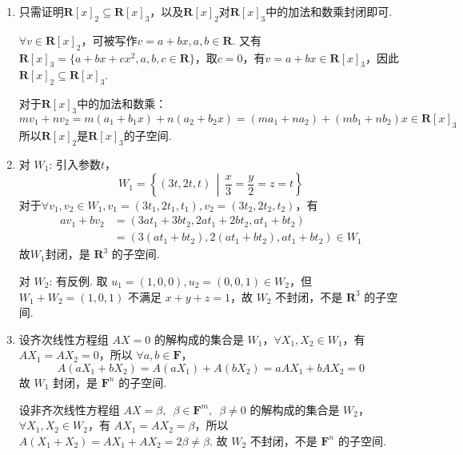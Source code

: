 \begin{solution}
    \begin{enumerate}
        \item 只需证明$\mathbf{R}[x]_2 \subseteq \mathbf{R}[x]_3$，以及$\mathbf{R}[x]_2$对$\mathbf{R}[x]_3$中的加法和数乘封闭即可.

              $\forall v \in \mathbf{R}[x]_2$，可被写作$v=a+bx,a,b \in \mathbf{R}$. 又有$\mathbf{R}[x]_3=\{a+bx+cx^2,a,b,c \in \mathbf{R}\}$，取$c=0$，有$v=a+bx \in \mathbf{R}[x]_3$，因此$\mathbf{R}[x]_2 \subseteq \mathbf{R}[x]_3$.

              对于$\mathbf{R}[x]_3$中的加法和数乘：
              \[mv_1+nv_2=m(a_1+b_1x)+n(a_2+b_2x)=(ma_1+na_2)+(mb_1+nb_2)x \in \mathbf{R}[x]_3\]
              所以$\mathbf{R}[x]_2$是$\mathbf{R}[x]_3$的子空间.

        \item 对 $W_1$: 引入参数$t$，
              \[W_1=\left\{(3t,2t,t) \,\middle|\, \frac{x}{3} = \frac{y}{2} = z = t\right\}\]
              对于$\forall v_1, v_2 \in W_1, v_1 = (3t_1, 2t_1, t_1), v_2 = (3t_2, 2t_2, t_2)$，有
              \begin{align*}
                  av_1 + bv_2 & = (3at_1 + 3bt_2, 2at_1 + 2bt_2, at_1 + bt_2)           \\
                              & = (3(at_1 + bt_2), 2(at_1 + bt_2), at_1 + bt_2) \in W_1
              \end{align*}
              故$W_1$封闭，是 $\mathbf{R}^3$ 的子空间.

              对 $W_2$: 有反例. 取 $u_1 = (1, 0, 0), u_2 = (0, 0, 1) \in W_2$，但 $W_1 + W_2 = (1, 0, 1)$ 不满足 $x + y + z = 1$，故 $W_2$ 不封闭，不是 $\mathbf{R}^3$ 的子空间.

        \item 设齐次线性方程组 $AX=0$ 的解构成的集合是 $W_1$，$\forall X_1, X_2 \in W_1$，有 $AX_1 = AX_2 = 0$，所以 $\forall a, b \in \mathbf{F}$，
              \[A(a X_1 + b X_2) = A(a X_1) + A(b X_2) = a AX_1 + b AX_2 = 0\]
              故 $W_1$ 封闭，是 $\mathbf{F}^n$ 的子空间.

              设非齐次线性方程组 $AX = \beta,\enspace \beta \in \mathbf{F}^m,\enspace \beta \neq 0$ 的解构成的集合是 $W_2$，$\forall X_1, X_2 \in W_2$，有 $AX_1 = AX_2 = \beta$，所以 $A(X_1 + X_2) = AX_1 + AX_2 = 2\beta \neq \beta$. 故 $W_2$ 不封闭，不是 $\mathbf{F}^n$ 的子空间.
    \end{enumerate}
\end{solution}


